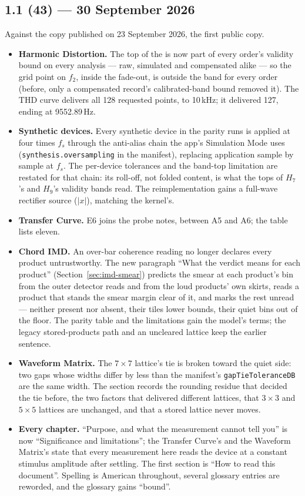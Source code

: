 \subsection*{1.1 (43) --- 30 September 2026}
Against the copy published on 23 September 2026, the first public copy.
\begin{itemize}
  \item \textbf{Harmonic Distortion.} The top of the  is
  now part of every order's validity bound on every analysis --- raw,
  simulated and compensated alike --- so the grid point on $f_2$, inside
  the fade-out, is outside the band for every order (before, only a
  compensated record's calibrated-band bound removed it). The THD curve
  delivers all 128 requested points, to 10\,kHz; it delivered 127, ending
  at 9552.89\,Hz.
  \item \textbf{Synthetic devices.} Every synthetic device in the parity
  runs is applied at four times $f_s$ through the anti-alias chain the
  app's Simulation Mode uses (\texttt{synthesis.oversampling} in the
  manifest), replacing application sample by sample at $f_s$. The
  per-device tolerances and the band-top limitation are restated for that
  chain: its roll-off, not folded content, is what the tops of $H_7$'s and
  $H_9$'s validity bands read. The reimplementation gains a full-wave
  rectifier source ($|x|$), matching the kernel's.
  \item \textbf{Transfer Curve.} E6 joins the probe notes, between A5 and
  A6; the table lists eleven.
  \item \textbf{Chord IMD.} An over-bar coherence reading no longer
  declares every product untrustworthy. The new paragraph ``What the
  verdict means for each product'' (Section~\ref{sec:imd-smear}) predicts
  the smear at each product's bin from the outer detector reads and from
  the loud products' own skirts, reads a product that stands the smear
  margin clear of it, and marks the rest unread --- neither present nor
  absent, their tiles lower bounds, their quiet bins out of the floor. The
  parity table and the limitations gain the model's terms; the legacy
  stored-products path and an uncleared lattice keep the earlier
  sentence.
  \item \textbf{Waveform Matrix.} The $7 \times 7$ lattice's tie is broken
  toward the quiet side: two gaps whose widths differ by less than the
  manifest's \texttt{gapTieToleranceDB} are the same width. The section
  records the rounding residue that decided the tie before, the two
  factors that delivered different lattices, that $3 \times 3$ and
  $5 \times 5$ lattices are unchanged, and that a stored lattice never
  moves.
  \item \textbf{Every chapter.} ``Purpose, and what the measurement cannot
  tell you'' is now ``Significance and limitations''; the Transfer Curve's
  and the Waveform Matrix's state that every measurement here reads the
  device at a constant stimulus amplitude after settling. The first
  section is ``How to read this document''. Spelling is American
  throughout, several glossary entries are reworded, and the glossary
  gains ``bound''.
\end{itemize}
